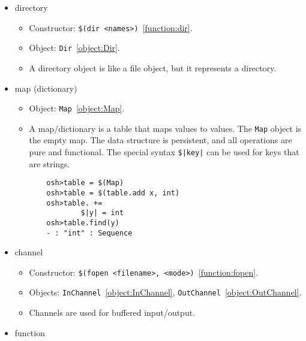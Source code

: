 \begin{itemize}
\item directory

\begin{itemize}
\item Constructor: \verb+$(dir <names>)+~\ref{function:dir}.
\item Object: \verb+Dir+~\ref{object:Dir}.
\item A directory object is like a file object, but it represents a directory.
\end{itemize}

\item map (dictionary)
\begin{itemize}
\item Object: \verb+Map+~\ref{object:Map}.
\item A map/dictionary is a table that maps values to values.  The \verb+Map+ object is the empty
  map.  The data structure is persistent, and all operations are pure and functional.  The special syntax
  \verb+$|key|+ can be used for keys that are strings.

\begin{verbatim}
    osh>table = $(Map)
    osh>table = $(table.add x, int)
    osh>table. +=
            $|y| = int
    osh>table.find(y)
    - : "int" : Sequence
\end{verbatim}
\end{itemize}

\item channel

\begin{itemize}
\item Constructor: \verb+$(fopen <filename>, <mode>)+~\ref{function:fopen}.
\item Objects: \verb+InChannel+~\ref{object:InChannel}, \verb+OutChannel+~\ref{object:OutChannel}.
\item Channels are used for buffered input/output.
\end{itemize}

\item function


\end{itemize}
